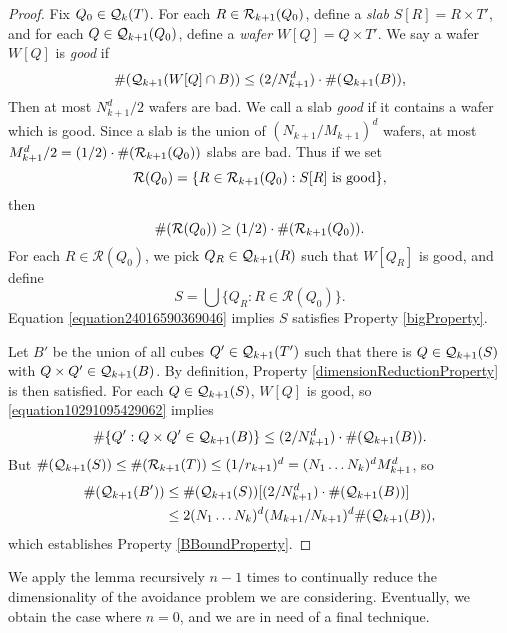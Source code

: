 \begin{proof}
    Fix $Q_0 \in \operatorname{\mathcal{Q}}_k(T)$. For each $R \in \operatorname{\mathcal{R}}_{k+1}(Q_0)$, define a \emph{slab} $S[R] = R \times T'$, and for each $Q \in \operatorname{\mathcal{Q}}_{k+1}(Q_0)$, define a \emph{wafer} $W[Q] = Q \times T'$. We say a wafer $W[Q]$ is \emph{good} if
    \begin{equation} \label{equation10291095429062}
        \#(\operatorname{\mathcal{Q}}_{k+1}(W[Q] \cap B)) \leq (2/N_{k+1}^d) \cdot \#(\operatorname{\mathcal{Q}}_{k+1}(B)),
    \end{equation}
    Then at most $N_{k+1}^d/2$ wafers are bad. We call a slab \emph{good} if it contains a wafer which is good. Since a slab is the union of $(N_{k+1}/M_{k+1})^d$ wafers, at most $M_{k+1}^d /2 = (1/2) \cdot \#(\operatorname{\mathcal{R}}_{k+1}(Q_0))$ slabs are bad. Thus if we set
    \[ \mathcal{R}(Q_0) = \{ R \in \operatorname{\mathcal{R}}_{k+1}(Q_0) : S[R]\ \text{is good} \}, \]
    then
    \begin{equation} \label{equation24016590369046}
        \#(\mathcal{R}(Q_0)) \geq (1/2) \cdot \#(\operatorname{\mathcal{R}}_{k+1}(Q_0)).
    \end{equation}
    For each $R \in \mathcal{R}(Q_0)$, we pick $Q_R \in \operatorname{\mathcal{Q}}_{k+1}(R)$ such that $W[Q_R]$ is good, and define
    \[ S = \bigcup \{ Q_R : R \in \mathcal{R}(Q_0) \}. \]
    Equation \eqref{equation24016590369046} implies $S$ satisfies Property \ref{bigProperty}.

    Let $B'$ be the union of all cubes $Q' \in \operatorname{\mathcal{Q}}_{k+1}(T')$ such that there is $Q \in \operatorname{\mathcal{Q}}_{k+1}(S)$ with $Q \times Q' \in \operatorname{\mathcal{Q}}_{k+1}(B)$. By definition, Property \ref{dimensionReductionProperty} is then satisfied. For each $Q \in \operatorname{\mathcal{Q}}_{k+1}(S)$, $W[Q]$ is good, so \eqref{equation10291095429062} implies
    \[ \# \{ Q' : Q \times Q' \in \operatorname{\mathcal{Q}}_{k+1}(B) \} \leq (2/N_{k+1}^d) \cdot \#(\operatorname{\mathcal{Q}}_{k+1}(B)). \]
    But $\#(\operatorname{\mathcal{Q}}_{k+1}(S)) \leq \#(\operatorname{\mathcal{R}}_{k+1}(T)) \leq (1/r_{k+1})^d = (N_1 \dots N_k)^d M_{k+1}^d$, so
    \begin{align*}
        \#(\operatorname{\mathcal{Q}}_{k+1}(B')) &\leq \#(\operatorname{\mathcal{Q}}_{k+1}(S))[(2/N_{k+1}^d) \cdot \#(\operatorname{\mathcal{Q}}_{k+1}(B))]\\
        &\leq 2(N_1 \dots N_k)^d (M_{k+1}/N_{k+1})^d \#(\operatorname{\mathcal{Q}}_{k+1}(B)),
    \end{align*}
    which establishes Property \ref{BBoundProperty}.
\end{proof}

We apply the lemma recursively $n-1$ times to continually reduce the dimensionality of the avoidance problem we are considering. Eventually, we obtain the case where $n = 0$, and we are in need of a final technique.

